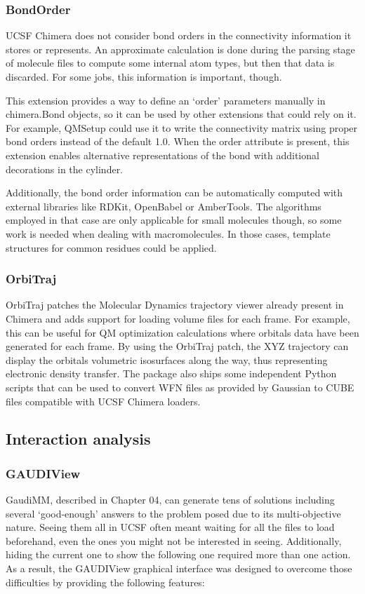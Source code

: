 \subsubsection{BondOrder}
UCSF Chimera does not consider bond orders in the connectivity information it stores or represents. An approximate calculation is done during the parsing stage of molecule files to compute some internal atom types, but then that data is discarded. For some jobs, this information is important, though.

This extension provides a way to define an ‘order’ parameters manually in chimera.Bond objects, so it can be used by other extensions that could rely on it. For example, QMSetup could use it to write the connectivity matrix using proper bond orders instead of the default 1.0. When the order attribute is present, this extension enables alternative representations of the bond with additional decorations in the cylinder.

Additionally, the bond order information can be automatically computed with external libraries like RDKit, OpenBabel or AmberTools. The algorithms employed in that case are only applicable for small molecules though, so some work is needed when dealing with macromolecules. In those cases, template structures for common residues could be applied.

\subsubsection{OrbiTraj}
OrbiTraj patches the Molecular Dynamics trajectory viewer already present in Chimera and adds support for loading volume files for each frame. For example, this can be useful for QM optimization calculations where orbitals data have been generated for each frame. By using the OrbiTraj patch, the XYZ trajectory can display the orbitals volumetric isosurfaces along the way, thus representing electronic density transfer. The package also ships some independent Python scripts that can be used to convert WFN files as provided by Gaussian to CUBE files compatible with UCSF Chimera loaders.

\subsection{Interaction analysis}
\subsubsection{GAUDIView}
GaudiMM, described in Chapter 04, can generate tens of solutions including several ‘good-enough’ answers to the problem posed due to its multi-objective nature. Seeing them all in UCSF often meant waiting for all the files to load beforehand, even the ones you might not be interested in seeing. Additionally, hiding the current one to show the following one required more than one action. As a result, the GAUDIView graphical interface was designed to overcome those difficulties by providing the following features:


